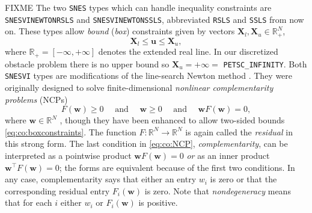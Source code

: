 \documentclass[final,leqno,onefignum,onetabnum]{siamltex1213bueler}
\newcommand\bw{\mathbf{w}}
\newcommand\RR{\mathbb{R}}
\newcommand{\pSNES}{\texttt{SNES}\xspace}
\begin{document}
FIXME The two \pSNES types which can handle inequality constraints are \texttt{SNESVINEWTONRSLS} and \texttt{SNESVINEWTONSSLS}, abbreviated \texttt{RSLS} and \texttt{SSLS} from now on.   These types allow \emph{bound} (\emph{box}) constraints given by vectors $\mathbf{X}_l,\mathbf{X}_u \in \RR_+^N$,
\begin{equation}
    \mathbf{X}_l \le \mathbf{u} \le \mathbf{X}_u,  \label{eq:co:boxconstraints}
\end{equation}
where $\RR_+=[-\infty,+\infty]$ denotes the extended real line.  In our discretized obstacle problem there is no upper bound so $\mathbf{X}_u=+\infty=$ \texttt{PETSC\_INFINITY}.  Both \texttt{SNESVI} types are modifications of the line-search Newton method \cite[Chapter 4]{Buelerbook}.  They were originally designed to solve finite-dimensional \emph{nonlinear complementarity problems} (NCPs)
\begin{equation}
       F(\bw) \ge 0 \quad \text{ and } \quad \bw \ge 0 \quad \text{ and } \quad \bw F(\bw) = 0, \label{eq:co:NCP}
\end{equation}
where $\bw \in \RR^N$ \cite{BensonMunson2006}, though they have been enhanced to allow two-sided bounds \eqref{eq:co:boxconstraints}.  The function $F:\RR^N \to \RR^N$ is again called the \emph{residual} in this strong form.  The last condition in \eqref{eq:co:NCP}, \emph{complementarity}, can be interpreted as a pointwise product $\bw F(\bw) = 0$ \emph{or} as an inner product $\bw^\top F(\bw)=0$; the forms are equivalent because of the first two conditions.  In any case, complementarity says that either an entry $w_i$ is zero or that the corresponding residual entry $F_i(\bw)$ is zero.  Note that \emph{nondegeneracy} means that for each $i$ either $w_i$ or $F_i(\bw)$ is positive.
\end{document}
